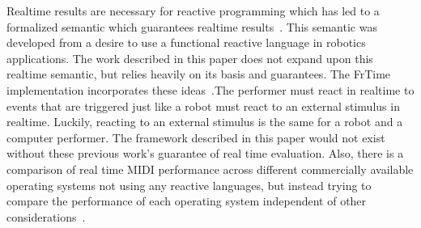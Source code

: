 \documentclass[12pt]{ucthesis}
\begin{document}
Realtime results are necessary for reactive programming which has led to a formalized semantic which guarantees realtime results~\cite{EventDriven}\cite{RealTime}. This semantic was developed from a desire to use a functional reactive language in robotics applications. The work described in this paper does not expand upon this realtime semantic, but relies heavily on its basis and guarantees. The FrTime implementation incorporates these ideas~\cite{FrTime}.The performer must react in realtime to events that are triggered just like a robot must react to an external stimulus in realtime. Luckily, reacting to an external stimulus is the same for a robot and a computer performer. The framework described in this paper would not exist without these previous work's guarantee of real time evaluation. Also, there is a comparison of real time MIDI performance across different commercially available operating systems not using any reactive languages, but instead trying to compare the performance of each operating system independent of other considerations~\cite{real-time-midi}.

\end{document}
